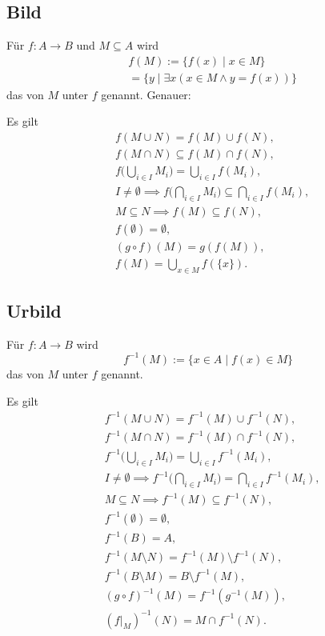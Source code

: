 \newpage
\subsection{Bild}
\begin{definition}[Bild]
Für $f\colon A\to B$ und $M\subseteq A$ wird
\begin{equation}
\begin{split}
&f(M) := \{f(x)\mid x\in M\}\\
& = \{y\mid \exists x(x\in M\land y=f(x))\}
\end{split}
\end{equation}
das  von $M$ unter $f$ genannt. Genauer:
\end{definition}
Es gilt
\begin{align}
&f(M\cup N) = f(M)\cup f(N),\\
&f(M\cap N) \subseteq f(M)\cap f(N),\\
&f\Big(\bigcup_{i\in I}M_i\Big) = \bigcup_{i\in I} f(M_i),\\
&I\ne\emptyset\implies f\Big(\bigcap_{i\in I} M_i\Big) \subseteq \bigcap_{i\in I} f(M_i),\\
&M\subseteq N\implies f(M)\subseteq f(N),\\
&f(\emptyset) = \emptyset,\\
&(g\circ f)(M) = g(f(M)),\\
&f(M) = \bigcup_{x\in M} f(\{x\}).
\end{align}

\subsection{Urbild}
\begin{definition}[Urbild]
Für $f\colon A\to B$ wird
\begin{equation}
f^{-1}(M) := \{x\in A\mid f(x)\in M\}
\end{equation}
das  von $M$ unter $f$ genannt.
\end{definition}
Es gilt
\begin{align}
& f^{-1}(M\cup N) = f^{-1}(M)\cup f^{-1}(N),\\
& f^{-1}(M\cap N) = f^{-1}(M)\cap f^{-1}(N),\\
& f^{-1}\Big(\bigcup_{i\in I}M_i\Big) = \bigcup_{i\in I} f^{-1}(M_i),\\
& I\ne\emptyset\implies f^{-1}\Big(\bigcap_{i\in I} M_i\Big) = \bigcap_{i\in I}f^{-1}(M_i),\\
& M\subseteq N\implies f^{-1}(M)\subseteq f^{-1}(N),\\
& f^{-1}(\emptyset) = \emptyset,\\
& f^{-1}(B) = A,\\
& f^{-1}(M\setminus N) = f^{-1}(M)\setminus f^{-1}(N),\\
& f^{-1}(B\setminus M) = B\setminus f^{-1}(M),\\
& (g\circ f)^{-1}(M) = f^{-1}(g^{-1}(M)),\\
& (f|_M)^{-1}(N) = M\cap f^{-1}(N).
\end{align}

